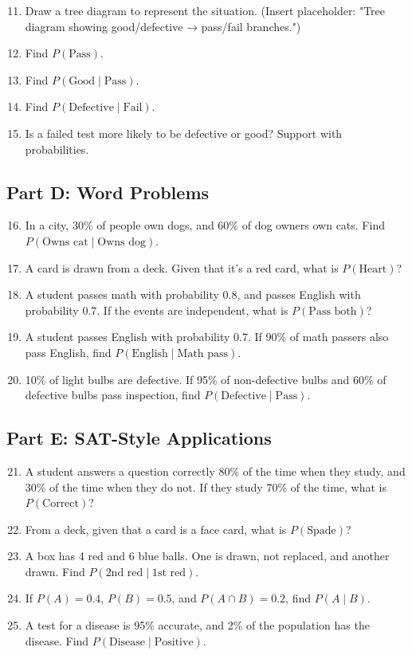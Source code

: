 \documentclass[12pt]{article}
\begin{document}
\begin{enumerate}
  \setcounter{enumi}{10}
  \item Draw a tree diagram to represent the situation. (Insert placeholder: "Tree diagram showing good/defective → pass/fail branches.")
  \item Find \(P(\text{Pass})\).
  \item Find \(P(\text{Good}\mid \text{Pass})\).
  \item Find \(P(\text{Defective}\mid \text{Fail})\).
  \item Is a failed test more likely to be defective or good? Support with probabilities.
\end{enumerate}

\subsection*{Part D: Word Problems}
\begin{enumerate}
  \setcounter{enumi}{15}
  \item In a city, 30\% of people own dogs, and 60\% of dog owners own cats. Find \(P(\text{Owns cat}\mid \text{Owns dog})\).
  \item A card is drawn from a deck. Given that it’s a red card, what is \(P(\text{Heart})\)?
  \item A student passes math with probability 0.8, and passes English with probability 0.7. If the events are independent, what is \(P(\text{Pass both})\)?
  \item A student passes English with probability 0.7. If 90\% of math passers also pass English, find \(P(\text{English}\mid \text{Math pass})\).
  \item 10\% of light bulbs are defective. If 95\% of non-defective bulbs and 60\% of defective bulbs pass inspection, find \(P(\text{Defective}\mid \text{Pass})\).
\end{enumerate}

\subsection*{Part E: SAT-Style Applications}
\begin{enumerate}
  \setcounter{enumi}{20}
  \item A student answers a question correctly 80\% of the time when they study, and 30\% of the time when they do not. If they study 70\% of the time, what is \(P(\text{Correct})\)?
  \item From a deck, given that a card is a face card, what is \(P(\text{Spade})\)?
  \item A box has 4 red and 6 blue balls. One is drawn, not replaced, and another drawn. Find \(P(\text{2nd red}\mid \text{1st red})\).
  \item If \(P(A)=0.4\), \(P(B)=0.5\), and \(P(A\cap B)=0.2\), find \(P(A\mid B)\).
  \item A test for a disease is 95\% accurate, and 2\% of the population has the disease. Find \(P(\text{Disease}\mid \text{Positive})\).
\end{enumerate}
\end{document}
